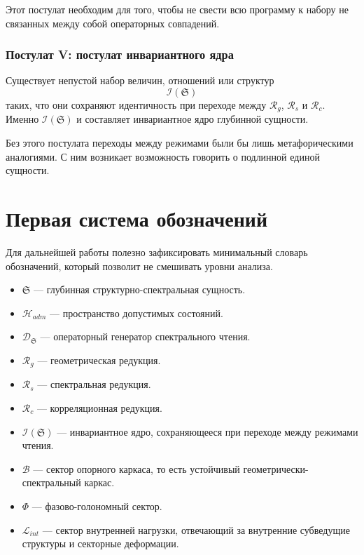 \documentclass[12pt,a4paper]{article}
\begin{document}
Этот постулат необходим для того, чтобы не свести всю программу к набору не связанных между собой операторных совпадений.

\subsubsection*{Постулат V: постулат инвариантного ядра}

Существует непустой набор величин, отношений или структур
\[
\mathcal{I}(\mathfrak{S})
\]
таких, что они сохраняют идентичность при переходе между \(\mathcal{R}_g\), \(\mathcal{R}_s\) и \(\mathcal{R}_c\). Именно \(\mathcal{I}(\mathfrak{S})\) и составляет инвариантное ядро глубинной сущности.

Без этого постулата переходы между режимами были бы лишь метафорическими аналогиями. С ним возникает возможность говорить о подлинной единой сущности.

\section{Первая система обозначений}

Для дальнейшей работы полезно зафиксировать минимальный словарь обозначений, который позволит не смешивать уровни анализа.

\begin{itemize}
    \item \(\mathfrak{S}\) --- глубинная структурно-спектральная сущность.
    \item \(\mathcal{H}_{adm}\) --- пространство допустимых состояний.
    \item \(\mathcal{D}_{\mathfrak{S}}\) --- операторный генератор спектрального чтения.
    \item \(\mathcal{R}_g\) --- геометрическая редукция.
    \item \(\mathcal{R}_s\) --- спектральная редукция.
    \item \(\mathcal{R}_c\) --- корреляционная редукция.
    \item \(\mathcal{I}(\mathfrak{S})\) --- инвариантное ядро, сохраняющееся при переходе между режимами чтения.
    \item \(\mathcal{B}\) --- сектор опорного каркаса, то есть устойчивый геометрически-спектральный каркас.
    \item \(\Phi\) --- фазово-голономный сектор.
    \item \(\mathcal{L}_{int}\) --- сектор внутренней нагрузки, отвечающий за внутренние субведущие структуры и секторные деформации.
\end{itemize}
\end{document}
